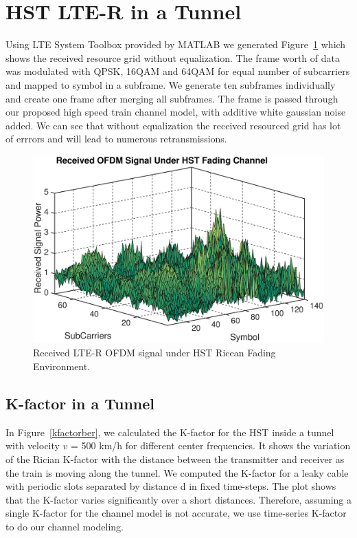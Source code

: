 \section{HST LTE-R in a Tunnel}
Using LTE System Toolbox provided by MATLAB we generated Figure~\ref{lteofdma} which shows the received resource grid without equalization. The frame worth of data was modulated with QPSK, 16QAM and 64QAM for equal number of subcarriers and mapped to symbol in a subframe. We generate ten subframes individually and create one frame after merging all subframes. The frame is passed through our proposed high speed train channel model, with additive white gaussian noise added. We can see that without equalization the received resourced grid has lot of errrors and will lead to numerous retransmissions.

\begin{figure}[!ht]
\label{lteofdma}
\centering
\includegraphics[width=\textwidth,keepaspectratio]{images/Gill/lte_figs/receivedsignal.eps} 
\caption{Received LTE-R OFDM signal under HST Ricean Fading Environment. }
\end{figure}

\subsection{K-factor in a Tunnel}
In Figure~\ref{kfactorber}, we calculated the K-factor for the HST inside a tunnel with velocity $v$ = 500 km/h for different center frequencies. It shows the variation of the Rician K-factor with the distance between the transmitter and receiver as the train is moving along the tunnel. We computed the K-factor for a leaky cable with periodic slots separated by distance d in fixed time-steps. The plot shows that the K-factor varies significantly over a short distances. Therefore, assuming a single K-factor for the channel model is not accurate, we use time-series K-factor to do our channel modeling.

